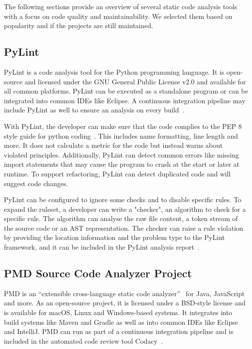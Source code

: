 The following sections provide an overview of several static code analysis tools with a focus on code quality and maintainability. We selected them based on popularity and if the projects are still maintained.

\subsection{PyLint}
PyLint is a code analysis tool for the Python programming language. It is open-source and licensed under the GNU General Public License v2.0 and available for all common platforms. PyLint can be executed as a standalone program or can be integrated into common IDEs like Eclipse. A continuous integration pipeline may include PyLint as well to ensure an analysis on every build~\cite{noauthor_pylint_nodate}.

With PyLint, the developer can make sure that the code complies to the PEP 8 style guide for python coding~\cite{pep8}. This includes name formatting, line length and more. It does not calculate a metric for the code but instead warns about violated principles. Additionally, PyLint can detect common errors like missing import statements that may cause the program to crash at the start or later at runtime. To support refactoring, PyLint can detect duplicated code and will suggest code changes.

PyLint can be configured to ignore some checks and to disable specific rules. To expand the ruleset, a developer can write a "checker", an algorithm to check for a specific rule. The algorithm can analyse the raw file content, a token stream of the source code or an AST representation. The checker can raise a rule violation by providing the location information and the problem type to the PyLint framework, and it can be included in the PyLint analysis report~\cite{noauthor_how_nodate}.

\subsection{PMD Source Code Analyzer Project}
PMD is an \enquote{extensible cross-language static code analyzer}~\cite{noauthor_pmd_nodate} for Java, JavaScript and more. As an open-source project, it is licensed under a BSD-style license and is available for macOS, Linux and Windows-based systems. It integrates into build systems like Maven and Gradle as well as into common IDEs like Eclipse and IntelliJ. PMD can run as part of a continuous integration pipeline and is included in the automated code review tool Codacy~\cite{noauthor_codacy_nodate-1}.


